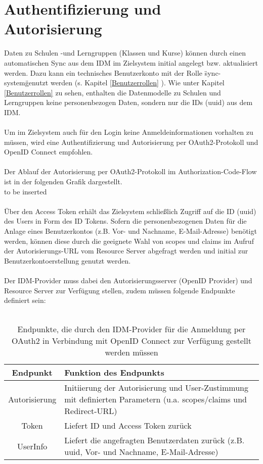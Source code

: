 \section{Authentifizierung und Autorisierung}
Daten zu Schulen -und Lerngruppen (Klassen und Kurse) können durch einen automatischen Sync aus dem IDM im Zielsystem initial angelegt bzw. aktualisiert werden. 
Dazu kann ein technisches Benutzerkonto mit der Rolle \"sync-system\" genutzt werden (s. Kapitel \ref{Benutzerrollen} ).
Wie unter Kapitel \ref{Benutzerrollen}  zu sehen, enthalten die Datenmodelle zu Schulen und Lerngruppen keine personenbezogen Daten, sondern nur die IDs (uuid) aus dem IDM. \\
\\
Um im Zielsystem auch für den Login keine Anmeldeinformationen vorhalten zu müssen, wird eine Authentifizierung und Autorisierung per OAuth2-Protokoll und OpenID Connect empfohlen.\\
\\
Der Ablauf der Autorisierung per OAuth2-Protokoll im Authorization-Code-Flow ist in der folgenden Grafik dargestellt. 
\\
to be inserted\\
\\
Über den Access Token erhält das Zielsystem schließlich Zugriff auf die ID (uuid) des Users in Form des ID Tokens. 
Sofern die personenbezogenen Daten für die Anlage eines Benutzerkontos (z.B. Vor- und Nachname, E-Mail-Adresse) benötigt werden, können diese durch die geeignete Wahl von scopes und claims im Aufruf der Autorisierungs-URL vom Resource Server abgefragt werden und initial zur Benutzerkontoerstellung genutzt werden.\\
\\
Der IDM-Provider muss dabei den Autorisierungsserver (OpenID Provider) und Resource Server zur Verfügung stellen, zudem müssen folgende Endpunkte definiert sein:\\
\\
\begin{table}[htb]
    \begin{tabularx}{\textwidth}{|c|X|}
        \hline
\textbf{Endpunkt} & \textbf{Funktion des Endpunkts} \\ \hline
Autorisierung & Initiierung der Autorisierung und User-Zustimmung mit definierten Parametern (u.a. scopes/claims und Redirect-URL) \\ \hline
Token & Liefert ID und Access Token zurück \\ \hline
UserInfo & Liefert die angefragten Benutzerdaten zurück (z.B. uuid, Vor- und Nachname, E-Mail-Adresse) \\ \hline
    \end{tabularx}

        \caption{Endpunkte, die durch den IDM-Provider für die Anmeldung per OAuth2 in Verbindung mit OpenID Connect zur Verfügung gestellt werden müssen}
        \label{tab:auth:endpoints}
\end{table}

